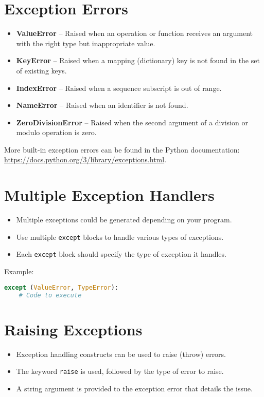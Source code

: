 \documentclass{article}
\begin{document}
\section{Exception Errors}
\begin{itemize}
    \item \textbf{ValueError} – Raised when an operation or function receives an argument with the right type but inappropriate value.
    \item \textbf{KeyError} – Raised when a mapping (dictionary) key is not found in the set of existing keys.
    \item \textbf{IndexError} – Raised when a sequence subscript is out of range.
    \item \textbf{NameError} – Raised when an identifier is not found.
    \item \textbf{ZeroDivisionError} – Raised when the second argument of a division or modulo operation is zero.
\end{itemize}

More built-in exception errors can be found in the Python documentation: \url{https://docs.python.org/3/library/exceptions.html}.

\section{Multiple Exception Handlers}
\begin{itemize}
    \item Multiple exceptions could be generated depending on your program.
    \item Use multiple \texttt{except} blocks to handle various types of exceptions.
    \item Each \texttt{except} block should specify the type of exception it handles.
\end{itemize}

Example:
\begin{lstlisting}[language=Python]
except (ValueError, TypeError):
    # Code to execute
\end{lstlisting}

\section{Raising Exceptions}
\begin{itemize}
    \item Exception handling constructs can be used to raise (throw) errors.
    \item The keyword \texttt{raise} is used, followed by the type of error to raise.
    \item A string argument is provided to the exception error that details the issue.
\end{itemize}
\end{document}
